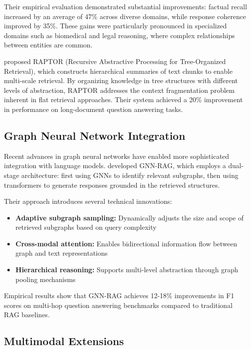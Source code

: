 \documentclass[12pt]{report}
\begin{document}
Their empirical evaluation demonstrated substantial improvements: factual recall increased by an average of 47\% across diverse domains, while response coherence improved by 35\%. These gains were particularly pronounced in specialized domains such as biomedical and legal reasoning, where complex relationships between entities are common.

\citet{sarthi2024raptor} proposed RAPTOR (Recursive Abstractive Processing for Tree-Organized Retrieval), which constructs hierarchical summaries of text chunks to enable multi-scale retrieval. By organizing knowledge in tree structures with different levels of abstraction, RAPTOR addresses the context fragmentation problem inherent in flat retrieval approaches. Their system achieved a 20\% improvement in performance on long-document question answering tasks.

\subsection{Graph Neural Network Integration}

Recent advances in graph neural networks have enabled more sophisticated integration with language models. \citet{mavromatis2024gnnrag} developed GNN-RAG, which employs a dual-stage architecture: first using GNNs to identify relevant subgraphs, then using transformers to generate responses grounded in the retrieved structures.

Their approach introduces several technical innovations:
\begin{itemize}
\item \textbf{Adaptive subgraph sampling:} Dynamically adjusts the size and scope of retrieved subgraphs based on query complexity
\item \textbf{Cross-modal attention:} Enables bidirectional information flow between graph and text representations
\item \textbf{Hierarchical reasoning:} Supports multi-level abstraction through graph pooling mechanisms
\end{itemize}

Empirical results show that GNN-RAG achieves 12-18\% improvements in F1 scores on multi-hop question answering benchmarks compared to traditional RAG baselines.

\subsection{Multimodal Extensions}
\end{document}
